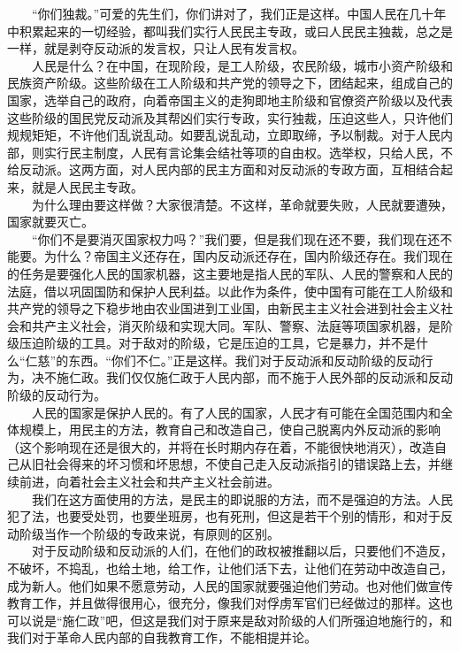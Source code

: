 \documentclass[cn,11pt,chinese]{elegantbook}
\begin{document}
　　“你们独裁。”可爱的先生们，你们讲对了，我们正是这样。中国人民在几十年中积累起来的一切经验，都叫我们实行人民民主专政，或曰人民民主独裁，总之是一样，就是剥夺反动派的发言权，只让人民有发言权。\\
　　人民是什么？在中国，在现阶段，是工人阶级，农民阶级，城市小资产阶级和民族资产阶级。这些阶级在工人阶级和共产党的领导之下，团结起来，组成自己的国家，选举自己的政府，向着帝国主义的走狗即地主阶级和官僚资产阶级以及代表这些阶级的国民党反动派及其帮凶们实行专政，实行独裁，压迫这些人，只许他们规规矩矩，不许他们乱说乱动。如要乱说乱动，立即取缔，予以制裁。对于人民内部，则实行民主制度，人民有言论集会结社等项的自由权。选举权，只给人民，不给反动派。这两方面，对人民内部的民主方面和对反动派的专政方面，互相结合起来，就是人民民主专政。\\
　　为什么理由要这样做？大家很清楚。不这样，革命就要失败，人民就要遭殃，国家就要灭亡。\\
　　“你们不是要消灭国家权力吗？”我们要，但是我们现在还不要，我们现在还不能要。为什么？帝国主义还存在，国内反动派还存在，国内阶级还存在。我们现在的任务是要强化人民的国家机器，这主要地是指人民的军队、人民的警察和人民的法庭，借以巩固国防和保护人民利益。以此作为条件，使中国有可能在工人阶级和共产党的领导之下稳步地由农业国进到工业国，由新民主主义社会进到社会主义社会和共产主义社会，消灭阶级和实现大同。军队、警察、法庭等项国家机器，是阶级压迫阶级的工具。对于敌对的阶级，它是压迫的工具，它是暴力，并不是什么“仁慈”的东西。“你们不仁。”正是这样。我们对于反动派和反动阶级的反动行为，决不施仁政。我们仅仅施仁政于人民内部，而不施于人民外部的反动派和反动阶级的反动行为。\\
　　人民的国家是保护人民的。有了人民的国家，人民才有可能在全国范围内和全体规模上，用民主的方法，教育自己和改造自己，使自己脱离内外反动派的影响（这个影响现在还是很大的，并将在长时期内存在着，不能很快地消灭），改造自己从旧社会得来的坏习惯和坏思想，不使自己走入反动派指引的错误路上去，并继续前进，向着社会主义社会和共产主义社会前进。\\
　　我们在这方面使用的方法，是民主的即说服的方法，而不是强迫的方法。人民犯了法，也要受处罚，也要坐班房，也有死刑，但这是若干个别的情形，和对于反动阶级当作一个阶级的专政来说，有原则的区别。\\
　　对于反动阶级和反动派的人们，在他们的政权被推翻以后，只要他们不造反，不破坏，不捣乱，也给土地，给工作，让他们活下去，让他们在劳动中改造自己，成为新人。他们如果不愿意劳动，人民的国家就要强迫他们劳动。也对他们做宣传教育工作，并且做得很用心，很充分，像我们对俘虏军官们已经做过的那样。这也可以说是“施仁政”吧，但这是我们对于原来是敌对阶级的人们所强迫地施行的，和我们对于革命人民内部的自我教育工作，不能相提并论。\\
\end{document}

